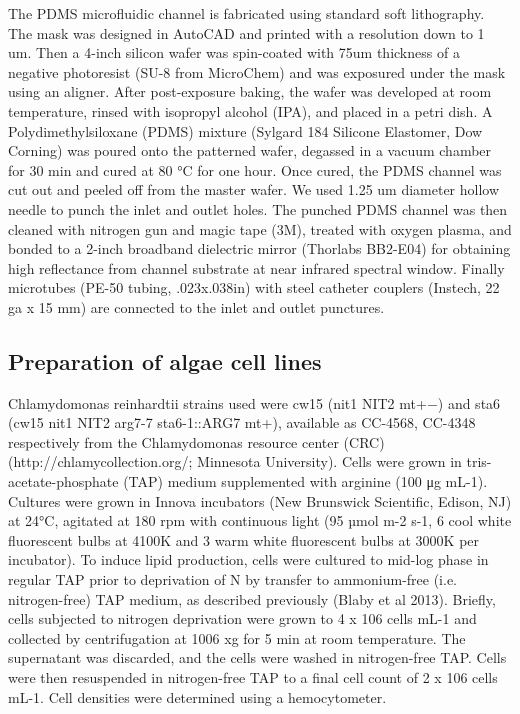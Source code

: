 \documentclass[aps,pra,preprint,superscriptaddress]{revtex4-1}
\begin{document}
The PDMS microfluidic channel is fabricated using standard soft lithography. The mask was designed in AutoCAD and printed with a resolution down to 1 um. Then a 4-inch silicon wafer was spin-coated with 75um thickness of a negative photoresist (SU-8 from MicroChem) and was exposured under the mask using an aligner. After post-exposure baking, the wafer was developed at room temperature, rinsed with isopropyl alcohol (IPA), and placed in a petri dish.  A Polydimethylsiloxane (PDMS) mixture (Sylgard 184 Silicone Elastomer, Dow Corning) was poured onto the patterned wafer, degassed in a vacuum chamber for 30 min and cured at 80 °C for one hour. Once cured, the PDMS channel was cut out and peeled off from the master wafer. We used 1.25 um diameter hollow needle to punch the inlet and outlet holes. 
The punched PDMS channel was then cleaned with nitrogen gun and magic tape (3M), treated with oxygen plasma, and bonded to a 2-inch broadband dielectric mirror (Thorlabs BB2-E04) for obtaining high reflectance from channel substrate at near infrared spectral window. Finally microtubes (PE-50 tubing, .023x.038in) with steel catheter couplers (Instech, 22 ga x 15 mm) are connected to the inlet and outlet punctures.

\subsection{Preparation of algae cell lines}

Chlamydomonas reinhardtii strains used were cw15 (nit1 NIT2 mt+−) and sta6 (cw15 nit1 NIT2 arg7-7 sta6-1::ARG7 mt+), available as CC-4568, CC-4348 respectively from the Chlamydomonas resource center (CRC) (http://chlamycollection.org/; Minnesota University). 
Cells were grown in tris-acetate-phosphate (TAP) medium supplemented with arginine (100 μg mL-1). Cultures were grown in Innova incubators (New Brunswick Scientific, Edison, NJ) at 24°C, agitated at 180 rpm with continuous light (95 µmol m-2 s-1, 6 cool white fluorescent bulbs at 4100K and 3 warm white fluorescent bulbs at 3000K per incubator). To induce lipid production, cells were cultured to mid-log phase in regular TAP prior to deprivation of N by transfer to ammonium-free (i.e. nitrogen-free) TAP medium, as described previously (Blaby et al 2013). Briefly, cells subjected to nitrogen deprivation were grown to 4 x 106 cells mL-1 and collected by centrifugation at 1006 xg for 5 min at room temperature. The supernatant was discarded, and the cells were washed in nitrogen-free TAP. Cells were then resuspended in nitrogen-free TAP to a final cell count of 2 x 106 cells mL-1. Cell densities were determined using a hemocytometer.
\end{document}
